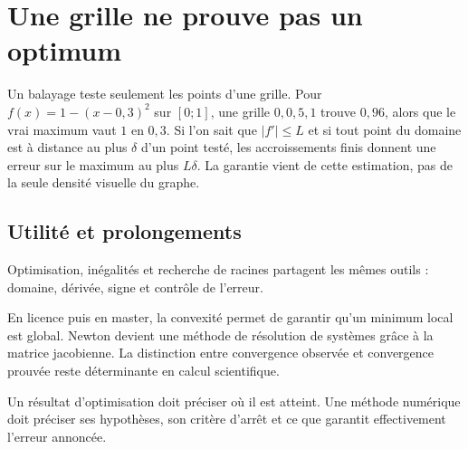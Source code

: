 \documentclass[../cours_1re.tex]{subfiles}
\begin{document}
\section{Une grille ne prouve pas un optimum}
Un balayage teste seulement les points d'une grille. Pour $f(x)=1-(x-0{,}3)^2$ sur $[0;1]$, une grille $0,0{,}5,1$ trouve $0{,}96$, alors que le vrai maximum vaut $1$ en $0{,}3$.
Si l'on sait que $|f'|\le L$ et si tout point du domaine est à distance au plus $\delta$ d'un point testé, les accroissements finis donnent une erreur sur le maximum au plus $L\delta$. La garantie vient de cette estimation, pas de la seule densité visuelle du graphe.

\begin{finchapitre}
\section{Utilité et prolongements}
Optimisation, inégalités et recherche de racines partagent les mêmes outils : domaine, dérivée, signe et contrôle de l'erreur.

En licence puis en master, la convexité permet de garantir qu'un minimum local est global. Newton devient une méthode de résolution de systèmes grâce à la matrice jacobienne. La distinction entre convergence observée et convergence prouvée reste déterminante en calcul scientifique.
\begin{retenir}
Un résultat d'optimisation doit préciser où il est atteint. Une méthode numérique doit préciser ses hypothèses, son critère d'arrêt et ce que garantit effectivement l'erreur annoncée.
\end{retenir}
\end{finchapitre}
\end{document}
